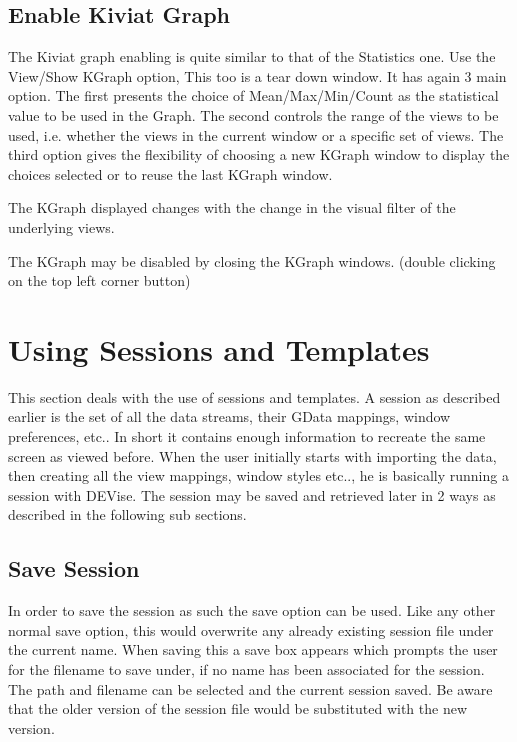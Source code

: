 \subsection{Enable Kiviat Graph}

The Kiviat graph enabling is  quite similar to that of the Statistics one. Use the View/Show KGraph option, This too is a tear down window. It has again 3 main option. The first presents the choice of Mean/Max/Min/Count as the statistical value to be used in the Graph. The second controls the range of the views to be used, i.e. whether the views in the current window or a specific set of views.  The third option gives the flexibility of choosing a new KGraph window to display the choices selected or to reuse the last KGraph window.

The KGraph displayed changes with the change in the visual filter of the underlying views.

The KGraph may be disabled by closing the KGraph windows. (double clicking on the top left corner button) 


\section{Using Sessions and Templates}

This section deals with the use of sessions and templates. A session as described earlier is the set of all the data streams, their GData mappings, window preferences, etc.. In short it contains enough information to recreate the same screen as viewed before. When the user initially starts with importing the data, then creating all the view mappings, window styles etc.., he is basically running  a session with DEVise. The session may be saved and retrieved later in  2 ways as described in the following sub sections.

\subsection{Save Session}

In order to save the session as such the save option can be used. Like any other normal save option, this would overwrite any already existing session file under the current name. When saving this a save box appears which prompts the user for the filename to save under, if no name has been associated for the session. The path and filename can be selected and the current session saved. Be aware that the older version of the session file would be substituted with the new version.


